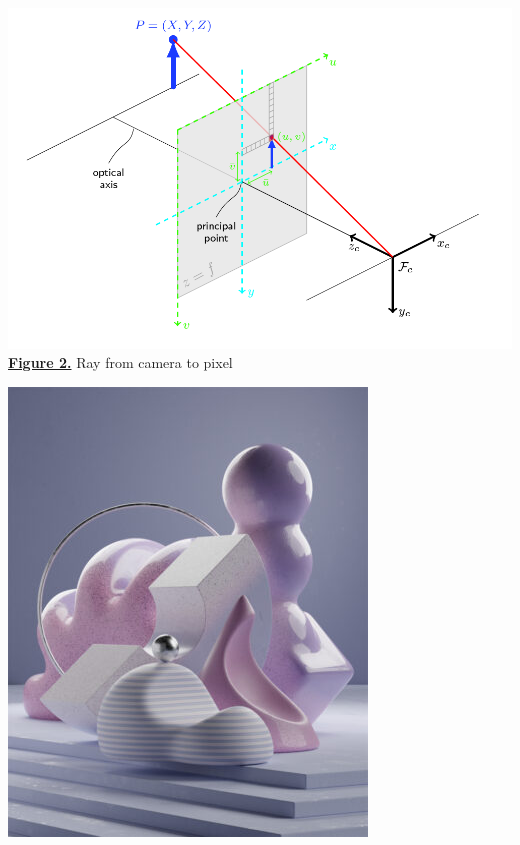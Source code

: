 \documentclass[12pt,a4paper]{article}
\theoremstyle{definition}
\begin{document}
\begin{center}
\begin{minipage}{0.35\textwidth}
    \centering
    \includegraphics[width=\textwidth]{pixel_position.png} \\
    \hyperlink{[Fig 2]}{\textbf{Figure 2.}} Ray from camera to pixel
\end{minipage}
\hfill
\begin{minipage}{0.2\textwidth}
    \centering
    \includegraphics[width=\textwidth]{color_intensity.jpg} \\

\end{minipage}
\end{center}
\end{document}
